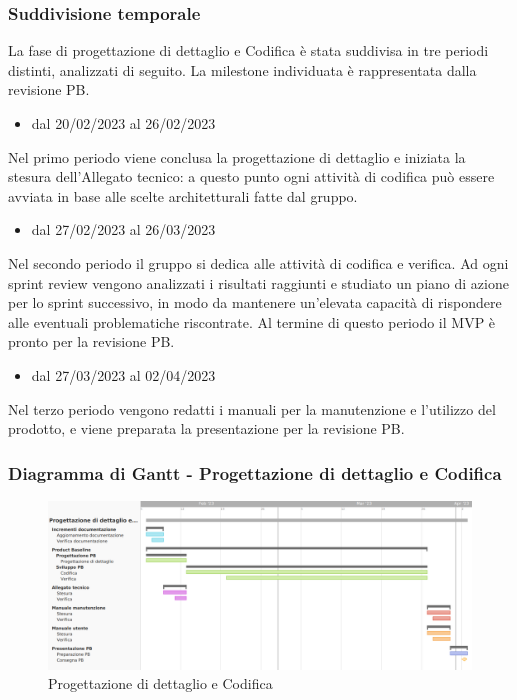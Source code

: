 \subsubsection{Suddivisione temporale}
La fase di progettazione di dettaglio e Codifica è stata suddivisa in tre periodi distinti, analizzati di seguito. La milestone individuata è rappresentata dalla revisione PB.

\begin{itemize}
    \item dal 20/02/2023 al 26/02/2023
\end{itemize}
Nel primo periodo viene conclusa la progettazione di dettaglio e iniziata la stesura dell’Allegato tecnico: a questo punto ogni attività di codifica può essere avviata in base alle scelte architetturali fatte dal gruppo.

\begin{itemize}
    \item dal 27/02/2023 al 26/03/2023
\end{itemize}
Nel secondo periodo il gruppo si dedica alle attività di codifica e verifica. Ad ogni sprint review vengono analizzati i risultati raggiunti e studiato un piano di azione per lo sprint successivo, in modo da mantenere un’elevata capacità di rispondere alle eventuali problematiche riscontrate. Al termine di questo periodo il MVP è pronto per la revisione PB.

\begin{itemize}
    \item dal 27/03/2023 al 02/04/2023
\end{itemize}
Nel terzo periodo vengono redatti i manuali per la manutenzione e l’utilizzo del prodotto, e viene preparata la presentazione per la revisione PB.

\subsubsection{Diagramma di Gantt - Progettazione di dettaglio e Codifica}

\begin{figure}[H]
\centering
\includegraphics[width=\textwidth]{img/4_codifica.png}
\caption{Progettazione di dettaglio e Codifica}
\end{figure}

